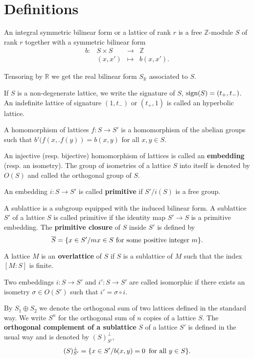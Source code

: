 \documentclass{amsart}
\begin{document}
\section{Definitions}


An integral symmetric bilinear form or a lattice of rank $r$ is a free $\mathbb Z$-module $S$ of rank $r$ together with a symmetric bilinear form
$$
\begin{matrix}
b: & S\times S & \rightarrow & \mathbb Z\\
 & (x,x') & \mapsto &  b(x,x').
\end{matrix}
$$


Tensoring by $\mathbb R$ we get the real bilinear form $S_{\mathbb R}$ associated to $S$.

If $S$ is a non-degenerate lattice, we write the signature of $S$, $\hbox{sign}(S)=(t_+,t_-)$. An indefinite lattice of signature $(1,t_-)$ or $(t_+,1)$ is called an hyperbolic lattice.

A homomorphism of lattices $f:S \rightarrow S'$ is a homomorphism of the abelian groups such that $b'(f(x,.f(y))=b(x,y)$ for all $x,y \in S$.


An injective (resp. bijective) homomorphism of lattices is called an {\bf{embedding}} (resp. an isometry). The group of isometries of a lattice $S$ into itself is denoted by $O(S)$ and called the orthogonal group of $S$.

An embedding $i:S \rightarrow S'$ is called {\bf{primitive}} if $S'/i(S)$ is a free group.


A sublattice is a subgroup equipped with the induced bilinear form. A sublattice $S'$ of a lattice $S$ is called primitive if the identity map $S' \rightarrow S$ is a primitive embedding.
The {\bf{primitive closure}} of $S$ inside $S'$ is defined by
$$\overline{S} =\{x\in S' / mx\in S \hbox{  for some positive integer }m \}.$$


A lattice $M$ is an{\bf{ overlattice}} of $S$ if $S$ is a sublattice of $M$ such that the index $[M:S]$ is finite.

Two embeddings $i:S \rightarrow S'$ and $i':S \rightarrow S'$ are called isomorphic if there exists an isometry $\sigma \in O(S')$ such that $i'=\sigma \circ i$. 

By $S_1\oplus S_2$ we denote the orthogonal sum of two lattices defined in the standard way. We write $S^n$ for the orthogonal sum of $n$ copies of a lattice $S$. The {\bf{ orthogonal complement of a sublattice}} $S$ of a lattice $S'$ is defined in the usual way and is denoted by $(S)_{S'}^{\perp}$,
$$(S)_{S'}^{\perp}=\{x\in S'/ b(x,y)=0 \,\,\,\hbox{for all  }y\in S\}.$$
\end{document}
